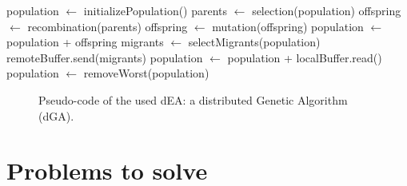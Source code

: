 \newsavebox{\algoadaptativebox}
\begin{lrbox}{\algoadaptativebox}
\begin{minipage}{10cm}
\begin{algorithmic} %
\STATE population $\gets$ initializePopulation()
    \STATE parents $\gets$ selection(population)
    \STATE offspring $\gets$ recombination(parents)
    \STATE offspring $\gets$ mutation(offspring)
    \STATE population $\gets$ population + offspring
      \STATE migrants $\gets$ selectMigrants(population)
      \STATE remoteBuffer.send(migrants)
    \ENDIF
      \STATE population $\gets$ population + localBuffer.read()
    \ENDIF
    \STATE population $\gets$ removeWorst(population)
\ENDWHILE
\end{algorithmic}
\end{minipage}
\end{lrbox}

\begin{figure}
\usebox{\algoadaptativebox}
\caption{Pseudo-code of the used dEA: a distributed Genetic Algorithm
  (dGA).} %
\label{fig:EAused}
\end{figure}




\section{Problems to solve}

